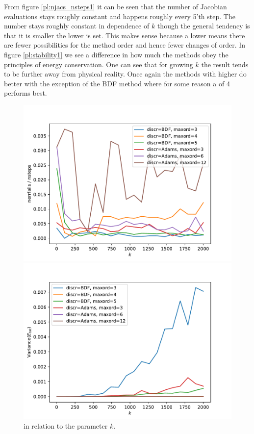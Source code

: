 \documentclass{report}
\newcounter{constant}
\begin{document}
From figure \ref{pl:njacs_nsteps1} it can be seen that the number of Jacobian evaluations stays roughly constant and happens roughly every 5'th step. The number  stays roughly constant in dependence of $k$ though the general tendency is that it is smaller the lower  is set. This makes sense because a lower  means there are fewer possibilities for the method order and hence fewer changes of order. In figure \ref{pl:stability1} we see a difference in how much the methods obey the principles of energy conservation. One can see that for growing $k$ the result tends to be further away from physical reality. Once again the methods with higher  do better with the exception of the BDF method where for some reason a  of 4 performs best.

\begin{figure}[h]
\centering
\begin{minipage}[b]{0.45\textwidth}
\centering
\includegraphics[width=\textwidth]{../Plots/Task4/Figure_212}
\caption{ in relation to the parameter $k$.}
\label{pl:nerrfails_nsteps1}
\end{minipage}
\hfill
\begin{minipage}[b]{0.45\textwidth}
\centering
\includegraphics[width=\textwidth]{../Plots/Task4/Figure_204}

\end{minipage}
\end{figure}
\end{document}
